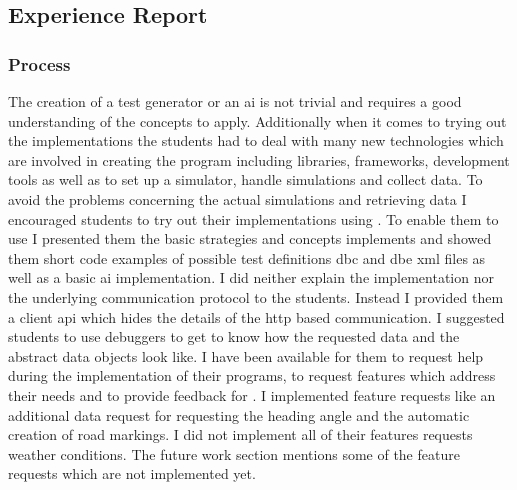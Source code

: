 \subsection{Experience Report}\label{subsec:experienceReport}
\subsubsection{Process}
The creation of a test generator or an \gls{ai} is not trivial and requires a good understanding of the concepts to apply.
Additionally when it comes to trying out the implementations the students had to deal with many new technologies which are involved in creating the program including libraries, frameworks, development tools as well as to set up a simulator, handle simulations and collect data.
To avoid the problems concerning the actual simulations and retrieving data I encouraged students to try out their implementations using \drivebuild{}.
To enable them to use \drivebuild{} I presented them the basic strategies and concepts \drivebuild{} implements and showed them short code examples of possible test definitions \ie{} \gls{dbc} and \gls{dbe} \gls{xml} files as well as a basic \gls{ai} implementation.
I did neither explain the implementation nor the underlying communication protocol to the students.
Instead I provided them a client \gls{api} which hides the details of the \gls{http} based communication.
I suggested students to use debuggers to get to know how the requested data and the abstract data objects look like.
I have been available for them to request help during the implementation of their programs, to request features which address their needs and to provide feedback for \drivebuild{}.
I implemented feature requests like an additional data request for requesting the heading angle and the automatic creation of road markings.
I did not implement all of their features requests \eg{} weather conditions.
The future work section mentions some of the feature requests which are not implemented yet.

